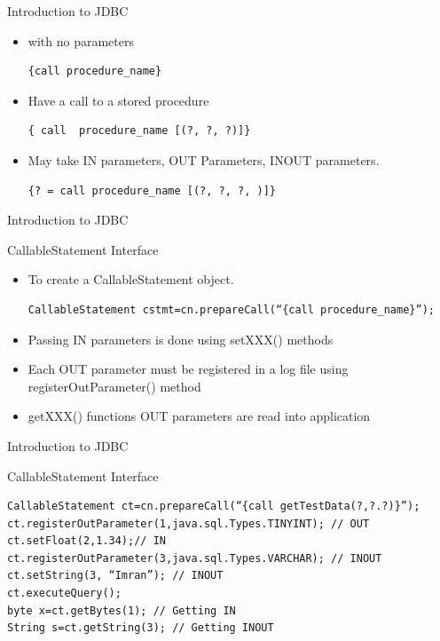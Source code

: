 \documentclass[14pt]{beamer}
\begin{document}
\begin{frame}[fragile]{Introduction to JDBC}
\begin{itemize}
\item with no parameters
\begin{lstlisting}[numbers=none]
{call procedure_name}
\end{lstlisting}
\item Have a call to a stored procedure 
\begin{lstlisting}[numbers=none]
{ call  procedure_name [(?, ?, ?)]}
\end{lstlisting}
\item May take IN parameters, OUT Parameters, INOUT parameters.
\begin{lstlisting}[numbers=none]
{? = call procedure_name [(?, ?, ?, )]}
\end{lstlisting}
\end{itemize}
\end{frame}

\begin{frame}[fragile]{Introduction to JDBC}
\begin{block}{}
CallableStatement Interface
\end{block}
\begin{itemize}
\item To create a CallableStatement object.
\begin{lstlisting}[numbers=none]
CallableStatement cstmt=cn.prepareCall(“{call procedure_name}”);
\end{lstlisting}
\item Passing IN parameters is done using setXXX() methods
\item Each OUT parameter must be registered in a log file using registerOutParameter() method
\item getXXX() functions OUT parameters are read into application
\end{itemize}
\end{frame}

\begin{frame}[fragile]{Introduction to JDBC}
\begin{block}{}
CallableStatement Interface
\end{block}
\begin{lstlisting}[numbers=none]
CallableStatement ct=cn.prepareCall(“{call getTestData(?,?.?)}”);
ct.registerOutParameter(1,java.sql.Types.TINYINT); // OUT
ct.setFloat(2,1.34);// IN
ct.registerOutParameter(3,java.sql.Types.VARCHAR); // INOUT 
ct.setString(3, “Imran”); // INOUT
ct.executeQuery();
byte x=ct.getBytes(1); // Getting IN
String s=ct.getString(3); // Getting INOUT
\end{lstlisting}
\end{frame}
\end{document}
